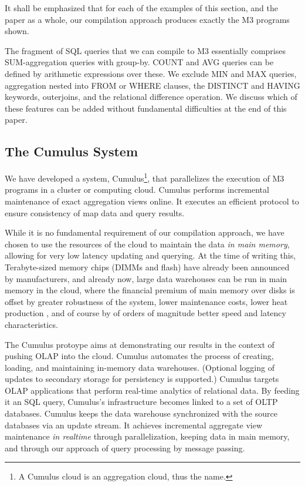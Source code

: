 It shall be emphasized that for each of the examples of this section,
and the paper as a whole, our compilation approach produces exactly
the M3 programs shown.


The fragment of SQL queries that we can compile to M3 essentially comprises
SUM-agg\-regation queries with group-by.
COUNT and AVG queries can be defined by arithmetic expressions over these.
We exclude MIN and MAX queries, aggregation
nested into FROM or WHERE clauses, the DISTINCT and HAVING keywords,
outerjoins,
and the relational difference operation.
We discuss which of these features can be added without fundamental
difficulties at the end of this paper.


\subsection{The Cumulus System}


We have developed a system, Cumulus\footnote{A Cumulus cloud is an
aggregation cloud, thus the name.}, that parallelizes the
execution of M3 programs in a cluster or computing cloud.
Cumulus performs incremental maintenance of exact aggregation views online.
It executes an efficient
protocol to ensure consistency of map data and query results.

While it is no fundamental requirement of our compilation
approach, we have chosen to use the resources of the cloud to maintain
the data {\em in main memory}\/,
allowing for very low latency updating and querying.
At the time of writing this,
Terabyte-sized memory chips (DIMMs and flash) have already been announced by
manufacturers, and already now, large data warehouses
can be run in main memory in the cloud, where the financial premium of
main memory over disks is
offset by greater robustness of the system, lower maintenance
costs, lower heat production \cite{1154557}, and of course by of orders
of magnitude better speed and latency characteristics.

The Cumulus protoype aims at demonstrating our results in the context of
pushing OLAP into the cloud.
Cumulus automates  the process of  creating, loading,
and  maintaining  in-memory  data  warehouses.
(Optional logging of updates to secondary storage
for persistency is supported.)
Cumulus targets OLAP applications  that perform real-time analytics of
relational data.  By feeding it an SQL query, Cumulus's infrastructure
becomes linked to  a set of OLTP databases.  Cumulus  keeps the
data warehouse synchronized with the source databases via an
update stream. It achieves incremental aggregate
view maintenance {\em in realtime}
through parallelization, keeping data in main memory, and through
our approach of query processing by message passing.


